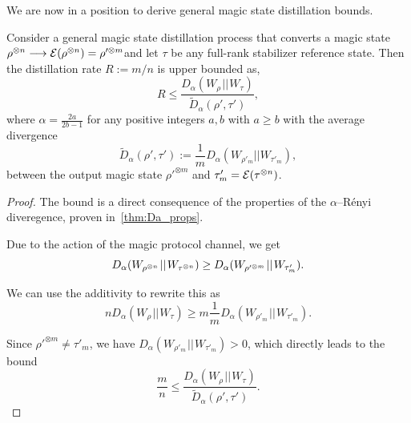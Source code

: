 \documentclass[pra,
aps,
twocolumn,
superscriptaddress,
groupedaddress,
nofootinbib,
reprint
]{revtex4-1}
\begin{document}
We are now in a position to derive general magic state distillation bounds.

\begingroup
\def\thetheorem{\ref{thm:entropic_bounds}}
\begin{theorem}
	Consider a general magic state distillation process that converts a magic state $\rho^{\otimes n} \longrightarrow {\mathcal E}(\rho^{\otimes n})=\rho'^{\otimes m}$and let $\tau$ be any full-rank stabilizer reference state. Then the distillation rate $R := m/n$ is upper bounded as,
	\begin{equation}
		R \leq \frac{D_{\alpha}(W_\rho \hspace{1pt}||\hspace{1pt} W_\tau)}{\tilde{D}_\alpha( \rho', \tau')},
	\end{equation}
	where $\alpha = \frac{2a}{2b-1}$ for any positive integers $a,b$ with $a \geq b$ with the average divergence
	\begin{equation}
\tilde{D}_\alpha( \rho', \tau') := \frac{1}{m} D_\alpha (W_{\rho\prime_m} || W_{\tau'_m}),
\end{equation}
between the output magic state $\rho'^{\otimes m}$ and $\tau'_m = {\mathcal E}(\tau^{\otimes n})$.
\end{theorem}
\addtocounter{theorem}{-1}
\endgroup
\begin{proof}
	The bound is a direct consequence of the properties of the $\alpha$--R\'{e}nyi diveregence, proven in~\cref{thm:Da_props}.
	
Due to the action of the magic protocol channel, we get
\begin{equation}	
	D_\alpha(W_{\rho^{\otimes n}} \hspace{1pt}||\hspace{1pt} W_{\tau^{\otimes n}}) \geq D_\alpha (W_{\rho'^{\otimes m}} \hspace{1pt}||\hspace{1pt} W_{\tau'_m}).\vspace{10pt}
\end{equation}

We can use the additivity to rewrite this as
\begin{equation}
	n D_\alpha(W_\rho \hspace{1pt}||\hspace{1pt} W_\tau) \geq m \frac{1}{m}D_\alpha(W_{\rho'_m} \hspace{1pt}||\hspace{1pt} W_{\tau'_m}).
\end{equation}

Since $\rho'^{\otimes m} \neq \tau'_m$, we have $D_\alpha(W_{\rho'_m} \hspace{1pt}||\hspace{1pt} W_{\tau'_m}) > 0$, which directly leads to the bound
\begin{equation}
	\frac{m}{n} \leq \frac{D_{\alpha}(W_\rho \hspace{1pt}||\hspace{1pt} W_\tau)}{\tilde{D}_\alpha( \rho', \tau')}.
\end{equation}
\end{proof}
\end{document}
